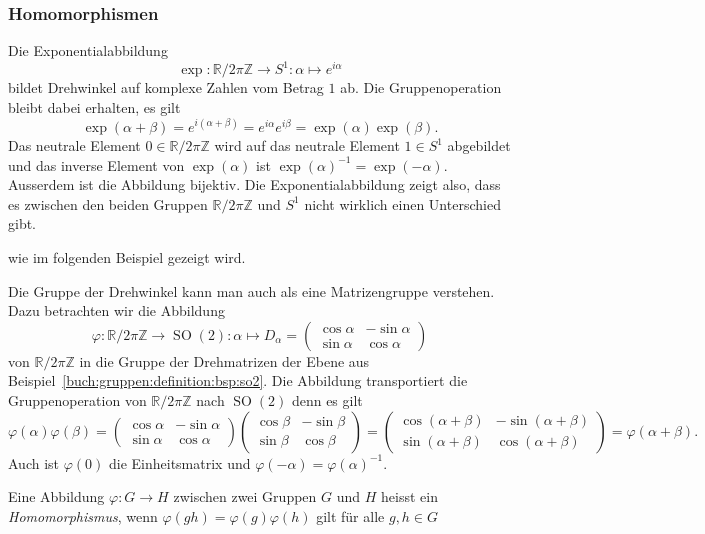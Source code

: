 %
%
\subsubsection{Homomorphismen}
Die Exponentialabbildung
\[
\exp
\colon
\mathbb{R}/2\pi\mathbb{Z} \to S^1
:
\alpha \mapsto e^{i\alpha}
\]
bildet Drehwinkel auf komplexe Zahlen vom Betrag $1$ ab.
Die Gruppenoperation bleibt dabei erhalten, es gilt
\[
\exp(\alpha + \beta)
=
e^{i(\alpha+\beta)}
=
e^{i\alpha}
e^{i\beta}
=
\exp(\alpha)
\exp(\beta).
\]
Das neutrale Element $0\in\mathbb{R}/2\pi\mathbb{Z}$ wird auf
das neutrale Element $1\in S^1$ abgebildet und das inverse
Element von $\exp(\alpha)$ ist
$ \exp(\alpha)^{-1} = \exp(-\alpha) $.
Ausserdem ist die Abbildung bijektiv.
Die Exponentialabbildung zeigt also, dass es zwischen den beiden
Gruppen $\mathbb{R}/2\pi\mathbb{Z}$ und $S^1$ nicht wirklich einen
Unterschied gibt.

wie im folgenden Beispiel gezeigt wird.

Die Gruppe der Drehwinkel kann man auch als eine Matrizengruppe
verstehen.
Dazu betrachten wir die Abbildung
\[
\varphi
\colon
\mathbb{R}/2\pi\mathbb{Z}
\to
\operatorname{SO}(2)
:
\alpha
\mapsto
D_\alpha
=
\begin{pmatrix}
\cos\alpha & -\sin\alpha \\
\sin\alpha &  \cos\alpha
\end{pmatrix}
\]
von $\mathbb{R}/2\pi\mathbb{Z}$ in die Gruppe der Drehmatrizen der
Ebene aus Beispiel~\ref{buch:gruppen:definition:bsp:so2}.
Die Abbildung transportiert die Gruppenoperation von
$\mathbb{R}/2\pi\mathbb{Z}$ nach $\operatorname{SO}(2)$ denn es gilt
\[
\varphi(\alpha)\varphi(\beta)
=
\begin{pmatrix}
\cos\alpha & -\sin\alpha \\
\sin\alpha &  \cos\alpha
\end{pmatrix}
\begin{pmatrix}
\cos\beta & -\sin\beta \\
\sin\beta &  \cos\beta
\end{pmatrix}
=
\begin{pmatrix}
\cos(\alpha+\beta) & -\sin(\alpha+\beta) \\
\sin(\alpha+\beta) &  \cos(\alpha+\beta)
\end{pmatrix}
=
\varphi(\alpha+\beta).
\]
Auch ist $\varphi(0)$ die Einheitsmatrix und
$\varphi(-\alpha)=\varphi(\alpha)^{-1}$.

\begin{definition}
\label{buch:gruppen:definition:def:homomorphismus}
Eine Abbildung $\varphi\colon G\to H$ zwischen zwei Gruppen $G$ und $H$
heisst ein {\em Homomorphismus}, wenn
$\varphi(gh)=\varphi(g)\varphi(h)$ gilt für alle $g,h\in G$
\end{definition}

